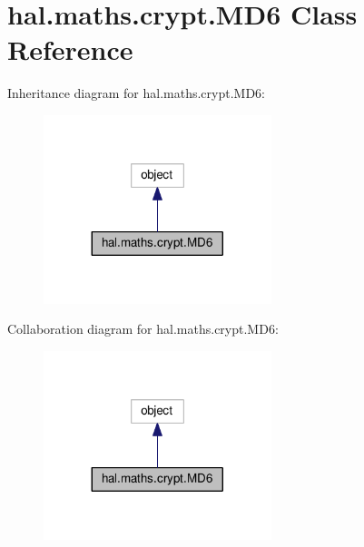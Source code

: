 \hypertarget{classhal_1_1maths_1_1crypt_1_1_m_d6}{}\section{hal.\+maths.\+crypt.\+M\+D6 Class Reference}
\label{classhal_1_1maths_1_1crypt_1_1_m_d6}


Inheritance diagram for hal.\+maths.\+crypt.\+M\+D6\+:
\nopagebreak
\begin{figure}[H]
\begin{center}
\leavevmode
\includegraphics[width=188pt]{classhal_1_1maths_1_1crypt_1_1_m_d6__inherit__graph}
\end{center}
\end{figure}


Collaboration diagram for hal.\+maths.\+crypt.\+M\+D6\+:
\nopagebreak
\begin{figure}[H]
\begin{center}
\leavevmode
\includegraphics[width=188pt]{classhal_1_1maths_1_1crypt_1_1_m_d6__coll__graph}
\end{center}
\end{figure}
